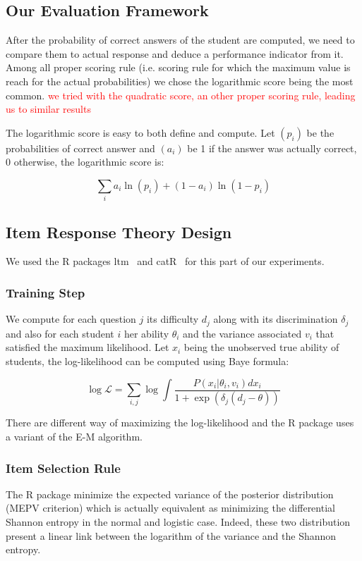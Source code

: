 \documentclass{sig-alternate}
\newcommand\alert[1]{\textcolor{red}{#1}}
\begin{document}
\subsection{Our Evaluation Framework}

After the probability of correct answers of the student are computed, we need to compare them to actual response and deduce a performance indicator from it. Among all proper scoring rule (i.e. scoring rule for which the maximum value is reach for the actual probabilities) we chose the logarithmic score being the most common. \alert{we tried with the quadratic score, an other proper scoring rule, leading us to similar results}

The logarithmic score is easy to both define and compute. Let $(p_i)$ be the probabilities of correct answer and $(a_i)$ be 1 if the answer was actually correct, 0 otherwise, the logarithmic score is: 

\[ \sum_i a_i\ln(p_i) + (1-a_i)\ln(1-p_i)\]

\subsection{Item Response Theory Design}

We used the R packages ltm~\cite{Rizopoulos2006} and catR~\cite{MagisRaiche2012} for this part of our experiments.

\subsubsection{Training Step}

We compute for each question $j$ its difficulty $d_j$ along with its discrimination $\delta_j$ and also for each student $i$ her ability $\theta_i$ and the variance associated $v_i$ that satisfied the maximum likelihood. Let $x_i$ being the unobserved true ability of students, the log-likelihood can be computed using Baye formula: 

\[\log \mathcal{L} = \sum_{i,j} \log \int \frac{P(x_i | \theta_i, v_i)dx_i}{1+\exp(\delta_j (d_j - \theta))}\]

There are different way of maximizing the log-likelihood and the R package uses a variant of the E-M algorithm. 

\subsubsection{Item Selection Rule}

The R package minimize the expected variance of the posterior distribution (MEPV criterion) which is actually equivalent as minimizing the differential Shannon entropy in the normal and logistic case. Indeed, these two distribution present a linear link between the logarithm of the variance and the Shannon entropy. 
\end{document}

